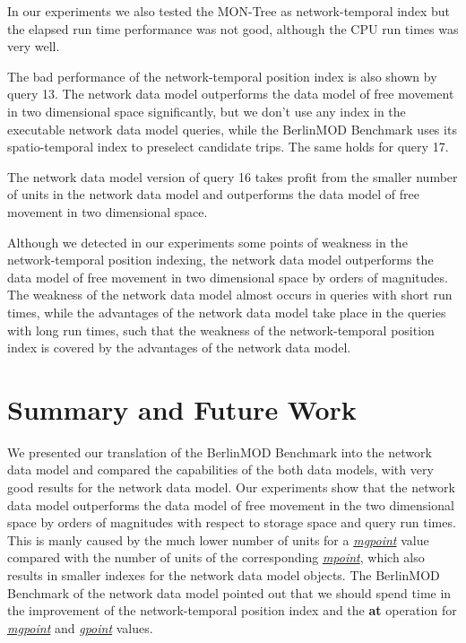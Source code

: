\documentclass[a4paper]{article}
\newcommand{\bmodb} {BerlinMOD Benchmark}
\newcommand{\op}[1]{\textbf{#1}}
\newcommand{\dt}[1]{\textsl{\underline{#1}}}
\begin{document}
{In our experiments we also tested the MON-Tree \cite{1046970} as network-temporal
index but the elapsed run time performance was not good, although the CPU run times
was very well.

The bad performance of the network-temporal position index is also shown by query 13.
The network data model outperforms the data model of free movement in two dimensional
space significantly, but we don't use any index in the executable network data model
queries, while the \bmodb{} uses its spatio-temporal index to preselect candidate
trips. The same holds for query 17.

The network data model version of query 16 takes profit from the smaller number
of units in the network data model and outperforms the data model of free movement
in two dimensional space.

Although we detected in our experiments some points of weakness in the network-temporal
position indexing, the network data model outperforms the data model of free movement in
two dimensional space by orders of magnitudes. The weakness of the network data model
almost occurs in queries with short run times, while the advantages of the network
data model take place in the queries with long run times, such that the weakness of
the network-temporal position index is covered by the advantages of the network
data model.
\section{Summary and Future Work}
\label{sec:summary}
We presented our translation of the \bmodb{} into the network data model and
compared the capabilities of the both data models, with very good results for the
network data model. Our experiments show that the network data model outperforms
the data model of free movement in the two dimensional space by orders of magnitudes
with respect to storage space and query run times. This is manly caused by the much
lower number of units for a \dt{mgpoint} value compared with the number of units
of the corresponding \dt{mpoint}, which also results in smaller indexes for the
network data model objects. The \bmodb{} of the network data model pointed out
that we should spend time in the improvement of the network-temporal position index
and the \op{at} operation for \dt{mgpoint} and \dt{gpoint} values.

}
\end{document}
